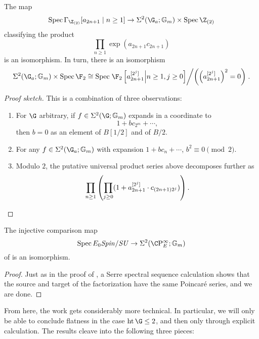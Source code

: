 \begin{lemma}
The map \[\Spec \Gamma_{\Z_{(2)}}[a_{2n + 1} \mid n \ge 1] \to \Sigma^2(\G_a; \Gm) \times \Spec \Z_{(2)}\] classifying the product \[\prod_{n \ge 1} \exp(a_{2n+1} c_{2n+1})\] is an isomorphism.  In turn, there is an isomorphism \[\Sigma^2(\G_a; \Gm) \times \Spec \F_2 \cong \Spec \left.\F_2\left[a_{2n+1}^{[2^j]} \middle| n \ge 1, j \ge 0\right] \middle/ \left(\left(a_{2n+1}^{[2^j]}\right)^2 = 0\right)\right. .\]
\end{lemma}
\begin{proof}[Proof sketch]
This is a combination of three observations:
\begin{enumerate}
    \item For \(\G\) arbitrary, if \(f \in \Sigma^2(\G; \Gm)\) expands in a coordinate to \[1 + b c_{2^m} + \cdots,\] then \(b = 0\) as an element of \(B[1/2]\) and of \(B/2\).
    \item For any \(f \in \Sigma^2(\G_a; \Gm)\) with expansion \(1 + b c_n + \cdots\), \(b^2 \equiv 0 \pmod{2}\).
    \item Modulo \(2\), the putative universal product series above decomposes further as \[\prod_{n \ge 1} \left(\prod_{j \ge 0} (1 + a_{2n+1}^{[2^j]} \cdot c_{(2n+1)2^j})\right). \qedhere\]
\end{enumerate}
\end{proof}

\begin{corollary}
The injective comparison map \[\Spec E_0 \Spin/\SU \to \Sigma^2(\CP^\infty_E; \Gm)\] of  is an isomorphism.
\end{corollary}
\begin{proof}
Just as in the proof of , a Serre spectral sequence calculation shows that the source and target of the factorization have the same Poincar\'e series, and we are done.
\end{proof}

From here, the work gets considerably more technical.  In particular, we will only be able to conclude flatness in the case \(\height \G \le 2\), and then only through explicit calculation.  The results cleave into the following three pieces:

